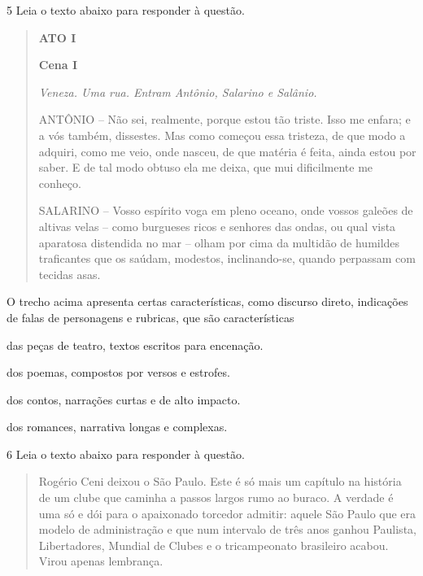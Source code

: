 \num{5} Leia o texto abaixo para responder à questão.

\begin{quote}
\textbf{ATO I}

\textbf{Cena I}

\textit{Veneza. Uma rua. Entram Antônio, Salarino e Salânio.}

ANTÔNIO -- Não sei, realmente, porque estou tão triste. Isso me enfara; e
a vós também, dissestes. Mas como começou essa tristeza, de que modo a
adquiri, como me veio, onde nasceu, de que matéria é feita, ainda estou
por saber. E de tal modo obtuso ela me deixa, que mui dificilmente me
conheço.

SALARINO -- Vosso espírito voga em pleno oceano, onde vossos galeões de
altivas velas -- como burgueses ricos e senhores das ondas, ou qual vista
aparatosa distendida no mar -- olham por cima da multidão de humildes
traficantes que os saúdam, modestos, inclinando-se, quando perpassam com
tecidas asas.

\end{quote}


O trecho acima apresenta certas características, como discurso direto,
indicações de falas de personagens e rubricas, que são características 

\begin{escolha}

  \item das peças de teatro, textos escritos para encenação.

  \item dos poemas, compostos por versos e estrofes.

  \item dos contos, narrações curtas e de alto impacto.

  \item dos romances, narrativa longas e complexas.

\end{escolha}

\num{6} Leia o texto abaixo para responder à questão. 

\begin{quote}

Rogério Ceni deixou o São Paulo. Este é só mais um capítulo na história
de um clube que caminha a passos largos rumo ao buraco. A verdade é uma
só e dói para o apaixonado torcedor admitir: aquele São Paulo que era
modelo de administração e que num intervalo de três anos ganhou
Paulista, Libertadores, Mundial de Clubes e o tricampeonato brasileiro
acabou. Virou apenas lembrança.

\end{quote}

